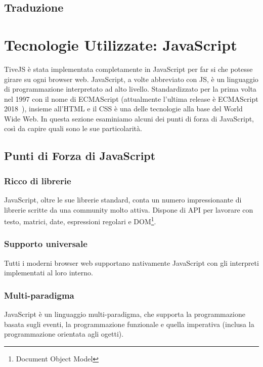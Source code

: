                 
        \subsection{Traduzione}

    \section{Tecnologie Utilizzate: JavaScript}
        TiveJS è stata implementata completamente in JavaScript per far si che potesse girare su ogni browser web.
        JavaScript, a volte abbreviato con JS, è un linguaggio di programmazione interpretato ad alto livello. Standardizzato per la prima volta nel 1997 con il nome di ECMAScript (attualmente l'ultima release è ECMAScript 2018~\cite{ecmascript}), insieme all'HTML e il CSS è una delle tecnologie alla base del World Wide Web.
        In questa sezione esaminiamo alcuni dei punti di forza di JavaScript, così da capire quali sono le sue particolarità.

        \subsection{Punti di Forza di JavaScript}

            \subsubsection{Ricco di librerie}
                JavaScript, oltre le sue librerie standard, conta un numero impressionante di librerie scritte da una community molto attiva. Dispone di API per lavorare con testo, matrici, date, espressioni regolari e DOM\footnote{Document Object Model}.

            \subsubsection{Supporto universale}
                Tutti i moderni browser web supportano nativamente JavaScript con gli interpreti implementati al loro interno.
            
            \subsubsection{Multi-paradigma}
                JavaScript è un linguaggio multi-paradigma, che supporta la programmazione basata sugli eventi, la programmazione funzionale e quella imperativa (inclusa la programmazione orientata agli ogetti).

